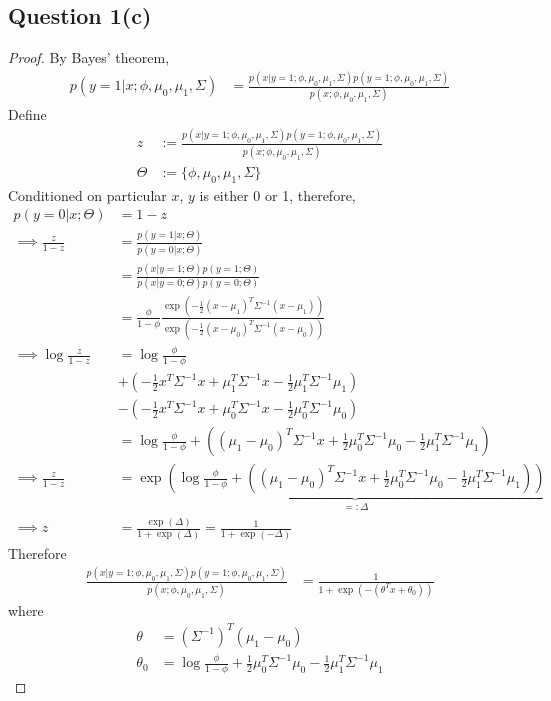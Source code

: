 \documentclass[11pt]{article}
\begin{document}
	\subsection{Question 1(c)}
	\begin{proof}
		By Bayes' theorem,
		\begin{align}
			p(y=1|x; \phi, \mu_0, \mu_1, \Sigma) &= \frac{p(x|y=1; \phi, \mu_0, \mu_1, \Sigma) p(y=1; \phi, \mu_0, \mu_1, \Sigma)}{p(x;\phi, \mu_0, \mu_1, \Sigma)}
		\end{align}
		Define 
		\begin{align}
			z &:= \frac{p(x|y=1; \phi, \mu_0, \mu_1, \Sigma) p(y=1; \phi, \mu_0, \mu_1, \Sigma)}{p(x;\phi, \mu_0, \mu_1, \Sigma)} \\
			\Theta &:= \{\phi, \mu_0, \mu_1, \Sigma\}
		\end{align}
		Conditioned on particular $x$, $y$ is either 0 or 1, therefore,
		\begin{align}
			p(y=0|x; \Theta) &= 1 - z \\
			\implies \frac{z}{1-z} &= \frac{p(y=1|x; \Theta)}{p(y=0|x; \Theta)} \\
			&= \frac{p(x|y=1; \Theta) p(y=1; \Theta)}{p(x|y=0; \Theta) p(y=0; \Theta)} \\
			&= \frac{\phi}{1 - \phi} \frac{\exp\left(-\frac{1}{2} (x-\mu_1)^T \Sigma^{-1} (x - \mu_1)\right)}{\exp\left(-\frac{1}{2} (x-\mu_0)^T \Sigma^{-1} (x - \mu_0)\right)} \\
			\implies \log \frac{z}{1-z} &= \log \frac{\phi}{1-\phi} \\
			&+ \left (-\frac{1}{2} x^T \Sigma^{-1} x + \mu_1^T \Sigma^{-1} x - \frac{1}{2} \mu_1^T \Sigma^{-1} \mu_1 \right) \\
			&- \left (-\frac{1}{2} x^T \Sigma^{-1} x + \mu_0^T \Sigma^{-1} x - \frac{1}{2} \mu_0^T \Sigma^{-1} \mu_0 \right) \\
			&= \log \frac{\phi}{1-\phi} + \left (
			(\mu_1 - \mu_0)^T \Sigma^{-1} x
			+ \frac{1}{2} \mu_0^T \Sigma^{-1} \mu_0 - \frac{1}{2} \mu_1^T \Sigma^{-1} \mu_1
			\right ) \\
			\implies \frac{z}{1-z} &= \exp \underbrace{\left (
			\log \frac{\phi}{1-\phi} + \left (
			(\mu_1 - \mu_0)^T \Sigma^{-1} x
			+ \frac{1}{2} \mu_0^T \Sigma^{-1} \mu_0 - \frac{1}{2} \mu_1^T \Sigma^{-1} \mu_1
			\right )
			\right )}_{=:\Delta} \\
			\implies z &= \frac{\exp(\Delta)}{1+\exp(\Delta)} = \frac{1}{1+\exp(-\Delta)}
		\end{align}
		Therefore
		\begin{align}
			\frac{p(x|y=1; \phi, \mu_0, \mu_1, \Sigma) p(y=1; \phi, \mu_0, \mu_1, \Sigma)}{p(x;\phi, \mu_0, \mu_1, \Sigma)}
			&= \frac{1}{1 + \exp(-(\theta^T x + \theta_0))}
		\end{align}
		where 
		\begin{align}
			\theta &= (\Sigma^{-1})^T (\mu_1 - \mu_0) \\
			\theta_0 &= \log \frac{\phi}{1-\phi} + \frac{1}{2} \mu_0^T \Sigma^{-1} \mu_0 - \frac{1}{2} \mu_1^T \Sigma^{-1} \mu_1
		\end{align}
	\end{proof}
	
\end{document}
